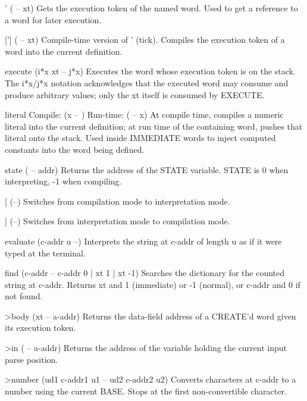 \documentclass[a4paper, 11pt, openany]{book}
\begin{document}
\begin{forthbox}
  '        ( -- xt)
           Gets the execution token of the named word. Used to
           get a reference to a word for later execution.

  [']      ( -- xt)
           Compile-time version of ' (tick). Compiles the
           execution token of a word into the current definition.

  execute  (i*x xt -- j*x)
           Executes the word whose execution token is on the stack.
           The i*x/j*x notation acknowledges that the executed
           word may consume and produce arbitrary values; only the
           xt itself is consumed by EXECUTE.

  literal  Compile: (x -- )  Run-time: ( -- x)
           At compile time, compiles a numeric literal into the
           current definition; at run time of the containing word,
           pushes that literal onto the stack. Used inside
           IMMEDIATE words to inject computed constants into the
           word being defined.

  state    ( -- addr)
           Returns the address of the STATE variable. STATE is 0
           when interpreting, -1 when compiling.

  [        (--)
           Switches from compilation mode to interpretation mode.

  ]        (--)
           Switches from interpretation mode to compilation mode.

  evaluate (c-addr u --)
           Interprets the string at c-addr of length u as if
           it were typed at the terminal.

  find     (c-addr -- c-addr 0 | xt 1 | xt -1)
           Searches the dictionary for the counted string at
           c-addr. Returns xt and 1 (immediate) or -1 (normal),
           or c-addr and 0 if not found.

  >body    (xt -- a-addr)
           Returns the data-field address of a CREATE'd word
           given its execution token.

  >in      ( -- a-addr)
           Returns the address of the variable holding the
           current input parse position.

  >number  (ud1 c-addr1 u1 -- ud2 c-addr2 u2)
           Converts characters at c-addr to a number using
           the current BASE. Stops at the first non-convertible
           character.
\end{forthbox}

\end{document}
